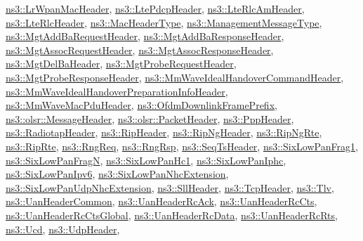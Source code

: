 \hyperlink{classns3_1_1LrWpanMacHeader}{ns3\+::\+Lr\+Wpan\+Mac\+Header}, \hyperlink{classns3_1_1LtePdcpHeader}{ns3\+::\+Lte\+Pdcp\+Header}, \hyperlink{classns3_1_1LteRlcAmHeader}{ns3\+::\+Lte\+Rlc\+Am\+Header}, \hyperlink{classns3_1_1LteRlcHeader}{ns3\+::\+Lte\+Rlc\+Header}, \hyperlink{classns3_1_1MacHeaderType}{ns3\+::\+Mac\+Header\+Type}, \hyperlink{classns3_1_1ManagementMessageType}{ns3\+::\+Management\+Message\+Type}, \hyperlink{classns3_1_1MgtAddBaRequestHeader}{ns3\+::\+Mgt\+Add\+Ba\+Request\+Header}, \hyperlink{classns3_1_1MgtAddBaResponseHeader}{ns3\+::\+Mgt\+Add\+Ba\+Response\+Header}, \hyperlink{classns3_1_1MgtAssocRequestHeader}{ns3\+::\+Mgt\+Assoc\+Request\+Header}, \hyperlink{classns3_1_1MgtAssocResponseHeader}{ns3\+::\+Mgt\+Assoc\+Response\+Header}, \hyperlink{classns3_1_1MgtDelBaHeader}{ns3\+::\+Mgt\+Del\+Ba\+Header}, \hyperlink{classns3_1_1MgtProbeRequestHeader}{ns3\+::\+Mgt\+Probe\+Request\+Header}, \hyperlink{classns3_1_1MgtProbeResponseHeader}{ns3\+::\+Mgt\+Probe\+Response\+Header}, \hyperlink{classns3_1_1MmWaveIdealHandoverCommandHeader}{ns3\+::\+Mm\+Wave\+Ideal\+Handover\+Command\+Header}, \hyperlink{classns3_1_1MmWaveIdealHandoverPreparationInfoHeader}{ns3\+::\+Mm\+Wave\+Ideal\+Handover\+Preparation\+Info\+Header}, \hyperlink{classns3_1_1MmWaveMacPduHeader}{ns3\+::\+Mm\+Wave\+Mac\+Pdu\+Header}, \hyperlink{classns3_1_1OfdmDownlinkFramePrefix}{ns3\+::\+Ofdm\+Downlink\+Frame\+Prefix}, \hyperlink{classns3_1_1olsr_1_1MessageHeader}{ns3\+::olsr\+::\+Message\+Header}, \hyperlink{classns3_1_1olsr_1_1PacketHeader}{ns3\+::olsr\+::\+Packet\+Header}, \hyperlink{classns3_1_1PppHeader}{ns3\+::\+Ppp\+Header}, \hyperlink{classns3_1_1RadiotapHeader}{ns3\+::\+Radiotap\+Header}, \hyperlink{classns3_1_1RipHeader}{ns3\+::\+Rip\+Header}, \hyperlink{classns3_1_1RipNgHeader}{ns3\+::\+Rip\+Ng\+Header}, \hyperlink{classns3_1_1RipNgRte}{ns3\+::\+Rip\+Ng\+Rte}, \hyperlink{classns3_1_1RipRte}{ns3\+::\+Rip\+Rte}, \hyperlink{classns3_1_1RngReq}{ns3\+::\+Rng\+Req}, \hyperlink{classns3_1_1RngRsp}{ns3\+::\+Rng\+Rsp}, \hyperlink{classns3_1_1SeqTsHeader}{ns3\+::\+Seq\+Ts\+Header}, \hyperlink{classns3_1_1SixLowPanFrag1}{ns3\+::\+Six\+Low\+Pan\+Frag1}, \hyperlink{classns3_1_1SixLowPanFragN}{ns3\+::\+Six\+Low\+Pan\+FragN}, \hyperlink{classns3_1_1SixLowPanHc1}{ns3\+::\+Six\+Low\+Pan\+Hc1}, \hyperlink{classns3_1_1SixLowPanIphc}{ns3\+::\+Six\+Low\+Pan\+Iphc}, \hyperlink{classns3_1_1SixLowPanIpv6}{ns3\+::\+Six\+Low\+Pan\+Ipv6}, \hyperlink{classns3_1_1SixLowPanNhcExtension}{ns3\+::\+Six\+Low\+Pan\+Nhc\+Extension}, \hyperlink{classns3_1_1SixLowPanUdpNhcExtension}{ns3\+::\+Six\+Low\+Pan\+Udp\+Nhc\+Extension}, \hyperlink{classns3_1_1SllHeader}{ns3\+::\+Sll\+Header}, \hyperlink{classns3_1_1TcpHeader}{ns3\+::\+Tcp\+Header}, \hyperlink{classns3_1_1Tlv}{ns3\+::\+Tlv}, \hyperlink{classns3_1_1UanHeaderCommon}{ns3\+::\+Uan\+Header\+Common}, \hyperlink{classns3_1_1UanHeaderRcAck}{ns3\+::\+Uan\+Header\+Rc\+Ack}, \hyperlink{classns3_1_1UanHeaderRcCts}{ns3\+::\+Uan\+Header\+Rc\+Cts}, \hyperlink{classns3_1_1UanHeaderRcCtsGlobal}{ns3\+::\+Uan\+Header\+Rc\+Cts\+Global}, \hyperlink{classns3_1_1UanHeaderRcData}{ns3\+::\+Uan\+Header\+Rc\+Data}, \hyperlink{classns3_1_1UanHeaderRcRts}{ns3\+::\+Uan\+Header\+Rc\+Rts}, \hyperlink{classns3_1_1Ucd}{ns3\+::\+Ucd}, \hyperlink{classns3_1_1UdpHeader}{ns3\+::\+Udp\+Header}, 